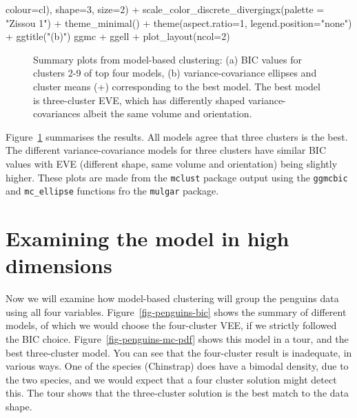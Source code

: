 \documentclass[
  letterpaper,
]{krantz}
\newenvironment{Shaded}{\begin{snugshade}}{\end{snugshade}}
\newcommand{\AttributeTok}[1]{\textcolor[rgb]{0.40,0.45,0.13}{#1}}
\newcommand{\DecValTok}[1]{\textcolor[rgb]{0.68,0.00,0.00}{#1}}
\newcommand{\FunctionTok}[1]{\textcolor[rgb]{0.28,0.35,0.67}{#1}}
\newcommand{\NormalTok}[1]{\textcolor[rgb]{0.00,0.23,0.31}{#1}}
\newcommand{\SpecialCharTok}[1]{\textcolor[rgb]{0.37,0.37,0.37}{#1}}
\newcommand{\StringTok}[1]{\textcolor[rgb]{0.13,0.47,0.30}{#1}}
\begin{document}
\begin{Shaded}
\begin{Highlighting}[]
                                        \AttributeTok{colour=}\NormalTok{cl),}
              \AttributeTok{shape=}\DecValTok{3}\NormalTok{, }\AttributeTok{size=}\DecValTok{2}\NormalTok{) }\SpecialCharTok{+}
  \FunctionTok{scale\_color\_discrete\_divergingx}\NormalTok{(}\AttributeTok{palette =} \StringTok{"Zissou 1"}\NormalTok{)  }\SpecialCharTok{+}
  \FunctionTok{theme\_minimal}\NormalTok{() }\SpecialCharTok{+}
  \FunctionTok{theme}\NormalTok{(}\AttributeTok{aspect.ratio=}\DecValTok{1}\NormalTok{, }\AttributeTok{legend.position=}\StringTok{"none"}\NormalTok{) }\SpecialCharTok{+}
  \FunctionTok{ggtitle}\NormalTok{(}\StringTok{"(b)"}\NormalTok{)}
\NormalTok{ggmc }\SpecialCharTok{+}\NormalTok{ ggell }\SpecialCharTok{+} \FunctionTok{plot\_layout}\NormalTok{(}\AttributeTok{ncol=}\DecValTok{2}\NormalTok{)}
\end{Highlighting}
\end{Shaded}

\begin{figure}[H]


\caption{\label{fig-penguins-bl-fl-mc}Summary plots from model-based
clustering: (a) BIC values for clusters 2-9 of top four models, (b)
variance-covariance ellipses and cluster means (+) corresponding to the
best model. The best model is three-cluster EVE, which has differently
shaped variance-covariances albeit the same volume and orientation.}

\end{figure}%

Figure~\ref{fig-penguins-bl-fl-mc} summarises the results. All models
agree that three clusters is the best. The different variance-covariance
models for three clusters have similar BIC values with EVE (different
shape, same volume and orientation) being slightly higher. These plots
are made from the \texttt{mclust} package output using the
\texttt{ggmcbic} and \texttt{mc\_ellipse} functions fro the
\texttt{mulgar} package.

\section{Examining the model in high
dimensions}\label{examining-the-model-in-high-dimensions}

Now we will examine how model-based clustering will group the penguins
data using all four variables. Figure~\ref{fig-penguins-bic} shows the
summary of different models, of which we would choose the four-cluster
VEE, if we strictly followed the BIC choice.
Figure~\ref{fig-penguins-mc-pdf} shows this model in a tour, and the
best three-cluster model. You can see that the four-cluster result is
inadequate, in various ways. One of the species (Chinstrap) does have a
bimodal density, due to the two species, and we would expect that a four
cluster solution might detect this. The tour shows that the
three-cluster solution is the best match to the data shape.
\end{document}
